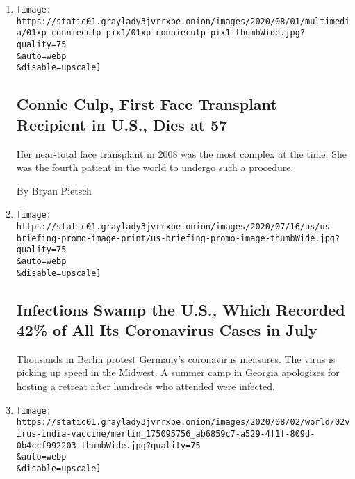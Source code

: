 \begin{enumerate}
\def\labelenumi{\arabic{enumi}.}
\item
  \href{/2020/08/01/us/Connie-culp-dead-face-transplant.html}{}

  \texttt{[image: https://static01.graylady3jvrrxbe.onion/images/2020/08/01/multimedia/01xp-connieculp-pix1/01xp-connieculp-pix1-thumbWide.jpg?quality=75\\\&auto=webp\\\&disable=upscale]}

  \hypertarget{connie-culp-first-face-transplant-recipient-in-us-dies-at-57}{%
  \subsection{Connie Culp, First Face Transplant Recipient in U.S., Dies
  at
  57}\label{connie-culp-first-face-transplant-recipient-in-us-dies-at-57}}

  Her near-total face transplant in 2008 was the most complex at the
  time. She was the fourth patient in the world to undergo such a
  procedure.

  By Bryan Pietsch
\item
  \href{/2020/08/01/world/coronavirus-covid-19.html}{}

  \texttt{[image: https://static01.graylady3jvrrxbe.onion/images/2020/07/16/us/us-briefing-promo-image-print/us-briefing-promo-image-thumbWide.jpg?quality=75\\\&auto=webp\\\&disable=upscale]}

  \hypertarget{infections-swamp-the-us-which-recorded-42-of-all-its-coronavirus-cases-in-july}{%
  \subsection{Infections Swamp the U.S., Which Recorded 42\% of All Its
  Coronavirus Cases in
  July}\label{infections-swamp-the-us-which-recorded-42-of-all-its-coronavirus-cases-in-july}}

  Thousands in Berlin protest Germany's coronavirus measures. The virus
  is picking up speed in the Midwest. A summer camp in Georgia
  apologizes for hosting a retreat after hundreds who attended were
  infected.
\item
  \href{/2020/08/01/world/asia/coronavirus-vaccine-india.html}{}

  \texttt{[image: https://static01.graylady3jvrrxbe.onion/images/2020/08/02/world/02virus-india-vaccine/merlin\_175095756\_ab6859c7-a529-4f1f-809d-0b4ccf992203-thumbWide.jpg?quality=75\\\&auto=webp\\\&disable=upscale]}

  \hypertarget{indian-billionaires-bet-big-on-head-start-in-coronavirus-vaccine-race}{%
}
\end{enumerate}
